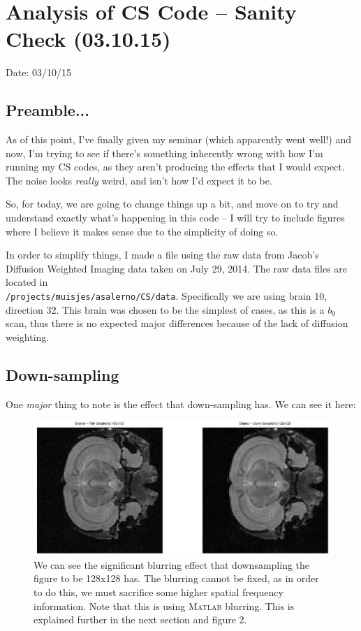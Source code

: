 \documentclass[11 pt]{article}
\newcommand{\matlab}{\textsc{Matlab }}
\let\oldsection\section
\renewcommand\section{\clearpage\newpage\oldsection}
\begin{document}
\section{Analysis of CS Code -- Sanity Check (03.10.15)}
\noindent Date: 03/10/15

  \subsection{Preamble...}
  As of this point, I've finally given my seminar (which apparently went well!) and now, I'm trying to see if there's something inherently wrong with how I'm running my CS codes, as they aren't producing the effects that I would expect. The noise looks \emph{really} weird, and isn't how I'd expect it to be.

  So, for today, we are going to change things up a bit, and move on to try and understand exactly what's happening in this code -- I will try to include figures where I believe it makes sense due to the simplicity of doing so.

  In order to simplify things, I made a file using the raw data from Jacob's Diffusion Weighted Imaging data taken on July 29, 2014. The raw data files are located in \\ \verb!/projects/muisjes/asalerno/CS/data!. Specifically we are using brain 10, direction 32. This brain was chosen to be the simplest of cases, as this is a $b_0$ scan, thus there is no expected major differences because of the lack of diffusion weighting.

  \subsection{Down-sampling}
  One \emph{major} thing to note is the effect that down-sampling has. We can see it here:

  \begin{figure}[h] 

    \centering
    \vspace{0pt}
    \setlength\fboxsep{0pt}
    \setlength\fboxrule{0.5pt}
    \includegraphics[trim = {60mm 100mm 46mm 70mm},clip,scale = 0.4] {Figs/CS_DTI_Sims/FullvsDownSample.eps}
    \caption{We can see the significant blurring effect that downsampling the figure to be 128x128 has. The blurring cannot be fixed, as in order to do this, we must sacrifice some higher spatial frequency information. Note that this is using \matlab blurring. This is explained further in the next section and figure 2.}
    \label{fig:dwnsamp}

  \end{figure}
\end{document}
